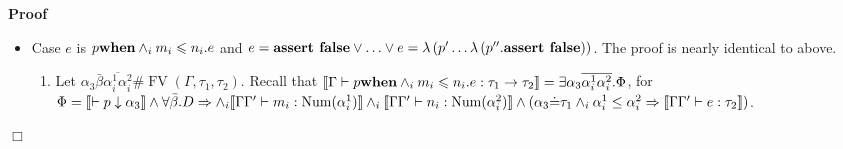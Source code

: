 \documentclass{article}
\newcommand{\tmname}[1]{\textsc{#1}}
\newcommand{\tmop}[1]{\ensuremath{\operatorname{#1}}}
\newcommand{\tmstrong}[1]{\textbf{#1}}
\newenvironment{proof}{\noindent\textbf{Proof\ }}{\hspace*{\fill}$\Box$\medskip}
\begin{document}
\begin{proof}
\begin{itemize}
\begin{enumerate}
      \item By instantiation of $\bar{\beta}$ and weakening, (3) implies
      \begin{eqnarray*}
        \Phi \wedge D \wedge_i \alpha^1_i \leq \alpha^2_i, \Gamma
        \Gamma^{\prime} & \vdash & e : \tau_2\\
        \Phi \wedge D, \Gamma \Gamma^{\prime} & \vdash & m_i : \tmop{Num}
        (\alpha^1_i)\\
        \Phi \wedge D, \Gamma \Gamma^{\prime} & \vdash & n_i : \tmop{Num}
        (\alpha^2_i)
      \end{eqnarray*}
      \item By weakening, (4) implies $\Phi \vdash p : \tau_1 \longrightarrow
      \exists \bar{\beta} [D] \Gamma^{\prime}$.
      
      \item By (5), (6), (1), and {\tmname{Clause}}, we obtain $\Phi, \Gamma
      \vdash p \text{{\tmstrong{when}}} \wedge_i m_i \leqslant n_i .e : \tau$.
      
      \item By (7) and {\tmname{Hide}}, we get the goal.
    \end{enumerate}
    \item Case $e$ is $p \text{{\tmstrong{when}}} \wedge_i m_i \leqslant n_i
    .e$ and $e = \text{{\tmstrong{assert false}}} \vee \ldots \vee e = \lambda
    \left( p^{\prime} \ldots \lambda \left( p^{\prime\prime} .
    \text{{\tmstrong{assert false}}} \right) \right)$. The proof is nearly
    identical to above.
    \begin{enumerate}
      \item Let $\alpha_3 \bar{\beta} \overline{\alpha^1_i \alpha^2_i} \#
      \tmop{FV} (\Gamma, \tau_1, \tau_2)$. Recall that $\left\llbracket \Gamma
      \vdash p \text{{\tmstrong{when}}} \wedge_i m_i \leqslant n_i .e : \tau_1
      \rightarrow \tau_2 \right\rrbracket = \exists \alpha_3
      \overline{\alpha^1_i \alpha^2_i} . \Phi$, for $\Phi = \\
      \llbracket \vdash p \downarrow \alpha_3 \rrbracket \wedge \forall
      \bar{\beta} .D \Rightarrow \wedge_i \llbracket \Gamma \Gamma^{\prime}
      \vdash m_i : \tmop{Num} (\alpha^1_i) \rrbracket \wedge_i \llbracket
      \Gamma \Gamma^{\prime} \vdash n_i : \tmop{Num} (\alpha^2_i) \rrbracket
      \\
      \wedge (\alpha_3 \dot{=} \tau_1 \wedge_i \alpha^1_i \leq \alpha^2_i
      \Rightarrow \llbracket \Gamma \Gamma^{\prime} \vdash e : \tau_2
      \rrbracket)$.
      

\end{enumerate}
\end{itemize}
\end{proof}
\end{document}
